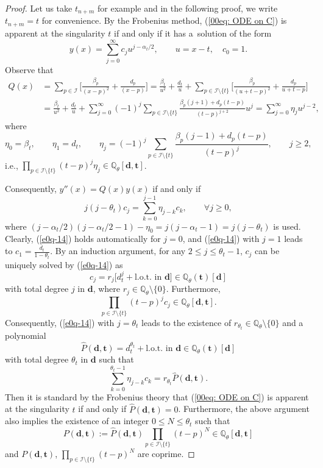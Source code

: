 \documentclass[11pt]{article}
\numberwithin{equation}{section}
\numberwithin{equation}{section}
\def\Q{\mathbb Q}
\begin{document}
\begin{proof} Let us take $t_{n+m}$ for example and in the following proof, we write $t_{n+m}=t$ for convenience. By the Frobenius method, (\ref{00eq: ODE on C}) is apparent at the singularity $t$ if and only if it has a~solution of the form
\[y(x)=\sum_{j=0}^{\infty}c_j u^{j-\alpha_{t}/2},\qquad u=x-t,\quad c_0=1.\]
Observe that
{\allowdisplaybreaks
\begin{align*}
Q(x)&=\sum_{p\in\mathcal{I}}\biggl[\frac{\beta_p}{(x-p)^2}+\frac{d_p}{(x-p)}\biggr]
=
\frac{\beta_t}{u^2}+\frac{d_t}{u}
+\sum_{p\in\mathcal{I}\setminus\{t\}}
\biggl[\frac{\beta_p}{(u+t-p)^2}+\frac{d_p}{u+t-p}\biggr]\\
&=\frac{\beta_t}{u^2}+\frac{d_t}{u}
+\sum_{j=0}^\infty(-1)^{j} \sum_{p\in\mathcal{I}\setminus\{t\}}\frac{\beta_p(j+1)+d_p(t-p)}{(t-p)^{j+2}}u^j
=\sum_{j=0}^{\infty}\eta_j u^{j-2},
\end{align*}
}%
where
\[\eta_0=\beta_t,\qquad \eta_1=d_t,\qquad
 \eta_j=(-1)^{j} \sum_{p\in\mathcal{I}\setminus\{t\}}\frac{\beta_p(j-1)+d_p(t-p)}{(t-p)^{j}},\qquad j\geq 2,
 \]
i.e., $\prod_{p\in\mathcal{I}\setminus\{t\}}(t-p)^j\eta_j\in \Q_\theta[\boldsymbol d,\boldsymbol t]$.

Consequently, $y''(x)=Q(x)y(x)$ if and only if
\begin{equation}\label{e0q-14}
j(j-\theta_t)c_j=\sum_{k=0}^{j-1}\eta_{j-k}c_k,\qquad\forall j\geq 0,
\end{equation}
where $(j-\alpha_t/2)(j-\alpha_t/2-1)-\eta_0=j(j-\alpha_t-1)=j(j-\theta_t)$ is used. Clearly, (\ref{e0q-14}) holds automatically for $j=0$, and (\ref{e0q-14}) with $j=1$ leads to $c_1=\frac{d_t}{1-\theta_t}$. By an induction argument, for any $2\leq j\leq \theta_t-1$, $c_j$ can be uniquely solved by (\ref{e0q-14}) as
\[c_j=r_j\bigl[d_{t}^j+\text{l.o.t. in $\boldsymbol d$}\bigr]\in \Q_\theta(\boldsymbol t)[\boldsymbol d]\]
with total degree $j$ in $\boldsymbol d$,
where $r_j\in\Q_\theta\setminus\{0\}$. Furthermore,
\[\prod_{p\in\mathcal{I}\setminus\{t\}}(t-p)^j c_j\in \Q_\theta[\boldsymbol d,\boldsymbol t].\]
Consequently, (\ref{e0q-14}) with $j=\theta_t$ leads to the existence of $r_{\theta_t}\in\Q_\theta\setminus\{0\}$ and a polynomial
\[\hat{P}(\boldsymbol d, \boldsymbol t)=d_t^{\theta_t}+\text{l.o.t.\ in $\boldsymbol d$}\in \Q_\theta(\boldsymbol t)[\boldsymbol d]\]
with total degree $\theta_t$ in $\boldsymbol d$ such that
\[
 \sum_{k=0}^{\theta_t-1}\eta_{j-k}c_k=r_{\theta_t}
 \hat{P}(\boldsymbol d, \boldsymbol t).
\]
Then it is standard by the Frobenius theory that (\ref{00eq: ODE on
 C}) is apparent at the singularity $t$ if and only if
$\hat{P}(\boldsymbol d, \boldsymbol t)=0$.
Furthermore, the above argument also implies the existence of an integer $0\leq N\leq \theta_t$ such that
\[
 P(\boldsymbol d, \boldsymbol t):=\hat{P}(\boldsymbol d, \boldsymbol
 t)\prod_{p\in\mathcal{I}\setminus\{t\}}(t-p)^{N}\in
 \Q_\theta[\boldsymbol d,\boldsymbol t]
\]
and $P(\boldsymbol d, \boldsymbol t)$, $\prod_{p\in\mathcal{I}\setminus\{t\}}(t-p)^{N}$ are coprime.
\end{proof}
\end{document}
